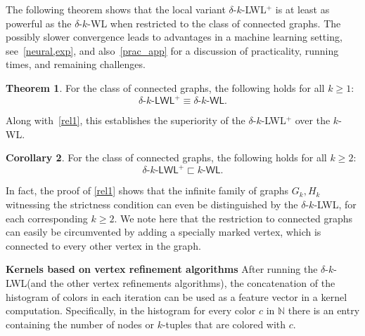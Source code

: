 \documentclass{article}
\newcommand{\xhdr}[1]{{\noindent\bfseries #1}}
\theoremstyle{definition}
\newtheorem{theorem}{Theorem}
\newtheorem{corollary}[theorem]{Corollary}
\newcommand{\bbN}{\ensuremath{\mathbb{N}}}
\newcommand{\kwl}{$k$-\textsf{WL}\xspace}
\newcommand{\deltakwl}{$\delta$-$k$-\textsf{WL}\xspace}
\newcommand{\kwlm}{k\textrm{-}\textsf{WL}\xspace}
\newcommand{\deltakwlm}{\delta\textrm{-}k\textrm{-}\textsf{WL}\xspace}
\newcommand{\localkwl}{$\delta$-$k$-\textsf{LWL}\xspace}
\newcommand{\pluskwl}{$\delta$-$k$-\textsf{LWL}$^+$\xspace}
\newcommand{\pluskwlm}{\delta\textrm{-}k\textrm{-}\textsf{LWL}^+\xspace}
\begin{document}
The following theorem shows that the local variant \pluskwl is at least as powerful as the \deltakwl when restricted to the class of connected graphs. The possibly slower convergence leads to advantages in a machine learning setting, see~\cref{neural,exp}, and also~\cref{prac_app} for a discussion of practicality, running times, and remaining challenges.
\begin{theorem}\label{loco}
	For the class of connected graphs, the following holds for all $k \geq 1$:
	\begin{equation*}
	\pluskwlm \equiv \deltakwlm.
	\end{equation*}
\end{theorem}	
Along with~\cref{rel1}, this establishes the superiority of the \pluskwl over the \kwl. 
\begin{corollary}\label{cloco} For the class of connected graphs, the following holds for all $k \geq 2$:	\begin{equation*}
	\pluskwlm \sqsubset \kwlm.
	\end{equation*}
\end{corollary}
In fact, the proof of \cref{rel1} shows that the infinite family of graphs $G_k, H_k$ witnessing the strictness condition can even be distinguished by the \localkwl,
for each corresponding $k \geq 2$. We note here that the restriction to connected graphs can easily be circumvented by adding a specially marked vertex, which is connected to every other vertex in the graph.

\xhdr{Kernels based on vertex refinement algorithms}
After running the \localkwl (and the other vertex refinements algorithms), the concatenation of the histogram of colors in each iteration can be used as a feature vector in a kernel computation. 
Specifically, in the histogram for every color $c$ in $\bbN$ there is an entry containing the number of nodes or $k$-tuples that are colored with $c$.
\end{document}
